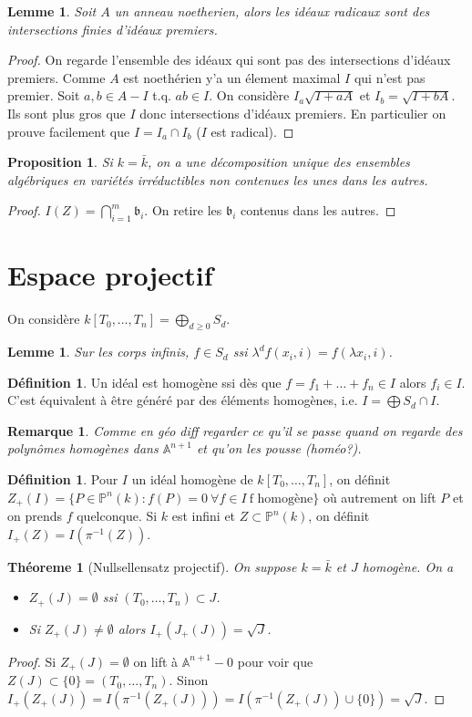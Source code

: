 \documentclass[a4paper,12pt]{book}
\newcommand{\A}{\mathbb{A}}
\renewcommand{\P}{\mathbb{P}}
\theoremstyle{plain}
\newtheorem{thm}[subsection]{Théoreme}
\newtheorem{lem}[subsection]{Lemme}
\newtheorem{prop}[subsection]{Proposition}
\newtheorem{rem}{Remarque}
\theoremstyle{definition}
\newtheorem{defn}[subsection]{Définition}
\theoremstyle{remark}
\begin{document}
\begin{lem}
    Soit $A$ un anneau noetherien, alors les idéaux radicaux sont 
    des intersections finies d'idéaux premiers.
\end{lem}
\begin{proof}
    On regarde l'ensemble des idéaux qui sont pas des intersections
    d'idéaux premiers. Comme $A$ est noethérien y'a un élement maximal
    $I$ qui n'est pas premier. Soit $a,b\in A-I$ t.q. $ab\in I$. On 
    considère $I_a\sqrt{I+aA}$ et $I_b=\sqrt{I+bA}$. Ils sont plus gros 
    que $I$ donc intersections d'idéaux premiers. En particulier
    on prouve facilement que $I=I_a\cap I_b$ ($I$ est radical).
\end{proof}
\begin{prop}
    Si $k=\bar k$, on a une décomposition unique des ensembles 
    algébriques en variétés irréductibles non contenues les unes dans 
    les autres.
\end{prop}
\begin{proof}
    $I(Z)=\bigcap_{i=1}^m \mathfrak b_i$. On retire les $\mathfrak b_i$
    contenus dans les autres.
\end{proof}
\section{Espace projectif}
On considère $k[T_0,\ldots, T_n]=\bigoplus_{d\geq 0} S_d$. 
\begin{lem}
    Sur les corps infinis, $f\in S_d$ ssi 
    $\lambda^df(x_i,i)=f(\lambda x_i,i)$.
\end{lem}
\begin{defn}
    Un idéal est homogène ssi dès que $f=f_1+\ldots+f_n\in I$ alors
    $f_i\in I$. C'est équivalent à être généré par des éléments 
    homogènes, i.e. $I=\bigoplus S_d\cap I$.
\end{defn}
\begin{rem}
    Comme en géo diff regarder ce qu'il se passe quand on regarde des 
    polynômes homogènes dans $\A^{n+1}$ et qu'on les pousse (homéo?).
\end{rem}
\begin{defn}
    Pour $I$ un idéal homogène de $k[T_0,\ldots, T_n]$, on définit 
    $Z_+(I)=\{P\in \P^n(k) : f(P)=0~\forall f\in I~\textrm{f homogène}\}$
    où autrement on lift $P$ et on prends $f$ quelconque. Si $k$ est
    infini et $Z\subset \P^n(k)$, on définit $I_+(Z)=I(\pi^{-1}(Z))$.
\end{defn}

\begin{thm}[Nullsellensatz projectif]
    On suppose $k=\bar k$ et $J$ homogène. On a 
    \begin{itemize}
	\item $Z_+(J)=\emptyset $ ssi $(T_0,\ldots,T_n)\subset J$.
	\item Si $Z_+(J)\ne \emptyset$ alors $I_+(J_+(J))=\sqrt J$.
    \end{itemize}
\end{thm}
\begin{proof}
    Si $Z_+(J)=\emptyset$ on lift à $\A^{n+1}-0$ pour voir que 
    $Z(J)\subset \{0\}=(T_0,\ldots, T_n)$. Sinon $I_+(Z_+(J))=I(\pi^{-1}
    (Z_+(J)))=I(\pi^{-1}(Z_+(J))\cup\{0\})=\sqrt J$.
\end{proof}
\end{document}

